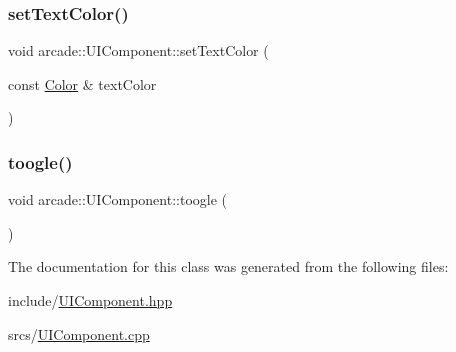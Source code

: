\mbox{\label{classarcade_1_1_u_i_component_abaab3b3d90da61e7a579b57f2cf3c35e}} 
\subsubsection{\texorpdfstring{set\+Text\+Color()}{setTextColor()}}
{\footnotesize\ttfamily void arcade\+::\+U\+I\+Component\+::set\+Text\+Color (\begin{DoxyParamCaption}\item[{const \hyperlink{unionarcade_1_1_color}{Color} \&}]{text\+Color }\end{DoxyParamCaption})}

\mbox{\label{classarcade_1_1_u_i_component_a055dcadcb7799e09fa9aa29c9e1b8f48}} 
\subsubsection{\texorpdfstring{toogle()}{toogle()}}
{\footnotesize\ttfamily void arcade\+::\+U\+I\+Component\+::toogle (\begin{DoxyParamCaption}{ }\end{DoxyParamCaption})}



The documentation for this class was generated from the following files\+:\begin{DoxyCompactItemize}
\item 
include/\hyperlink{_u_i_component_8hpp}{U\+I\+Component.\+hpp}\item 
srcs/\hyperlink{_u_i_component_8cpp}{U\+I\+Component.\+cpp}\end{DoxyCompactItemize}
